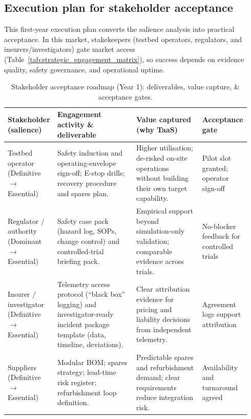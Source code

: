 \documentclass[11pt, a4paper]{report}
\numberwithin{equation}{section}
\begin{document}
\begin{refsection}
\section{Execution plan for stakeholder acceptance}
\label{sec:stakeholder_acceptance_execution_plan}

This first-year execution plan converts the salience analysis into practical acceptance. In this market, stakekeepers (testbed operators, regulators, and insurers/investigators) gate market access (Table~\ref{tab:strategic_engagement_matrix}), so success depends on evidence quality, safety governance, and operational uptime.

\begin{table}[htbp]
\centering
\small
\setlength{\tabcolsep}{3pt}
\renewcommand{\arraystretch}{1.15}
\caption{Stakeholder acceptance roadmap (Year 1): deliverables, value capture, \& acceptance gates.}
\label{tab:stakeholder_engagement_roadmap}
\begin{tabular}{|>{\raggedright\arraybackslash}p{0.17\linewidth}|>{\raggedright\arraybackslash}p{0.34\linewidth}|>{\raggedright\arraybackslash}p{0.28\linewidth}|>{\raggedright\arraybackslash}p{0.15\linewidth}|}
\hline
\textbf{Stakeholder (salience)} & \textbf{Engagement activity \& deliverable} & \textbf{Value captured (why TaaS)} & \textbf{Acceptance gate} \\
\hline
Testbed operator (Definitive $\rightarrow$ Essential) & Safety induction and operating-envelope sign-off; E-stop drills; recovery procedure and spares plan. & Higher utilisation; de-risked on-site operations without building their own target capability. & Pilot slot granted; operator sign-off \\
\hline
Regulator / authority (Dominant $\rightarrow$ Essential) & Safety case pack (hazard log, SOPs, change control) and controlled-trial briefing pack. & Empirical support beyond simulation-only validation; comparable evidence across trials. & No-blocker feedback for controlled trials \\
\hline
Insurer / investigator (Definitive $\rightarrow$ Essential) & Telemetry access protocol (``black box'' logging) and investigator-ready incident package template (data, timeline, deviations). & Clear attribution evidence for pricing and liability decisions from independent telemetry. & Agreement logs support attribution \\
\hline
Suppliers (Definitive $\rightarrow$ Essential) & Modular BOM; spares strategy; lead-time risk register; refurbishment loop definition. & Predictable spares and refurbishment demand; clear requirements reduce integration risk. & Availability and turnaround agreed \\

\end{tabular}
\end{table}
\end{refsection}
\end{document}
